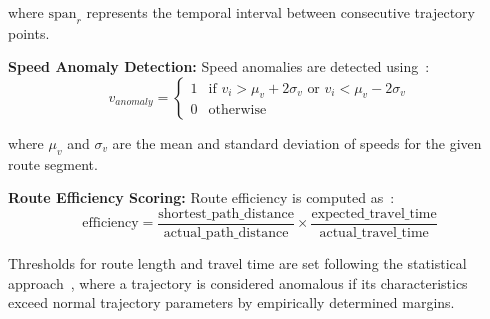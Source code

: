 \begin{description}
    where $\text{span}_r$ represents the temporal interval between consecutive trajectory points.

    \textbf{Speed Anomaly Detection:} Speed anomalies are detected using~\cite{wangDetectingAnomalousTrajectories2018}:
    \begin{equation}
      v_{anomaly} = \begin{cases}
        1 & \text{if } v_i > \mu_v + 2\sigma_v \text{ or } v_i < \mu_v - 2\sigma_v \\
        0 & \text{otherwise}
      \end{cases}
      \label{eq:speed-anomaly}
    \end{equation}

    where $\mu_v$ and $\sigma_v$ are the mean and standard deviation of speeds for the given route segment.

    \textbf{Route Efficiency Scoring:} Route efficiency is computed as~\cite{chenTemporalContextAwareRoute2021}:
    \begin{equation}
      \text{efficiency} = \frac{\text{shortest\_path\_distance}}{\text{actual\_path\_distance}} \times \frac{\text{expected\_travel\_time}}{\text{actual\_travel\_time}}
      \label{eq:efficiency}
    \end{equation}

    Thresholds for route length and travel time are set following the statistical approach~\cite{wangStatisticalFrameworkTaxi2020,wangDetectingAnomalousTrajectories2018}, where a trajectory is considered anomalous if its characteristics exceed normal trajectory parameters by empirically determined margins.


\end{description}
